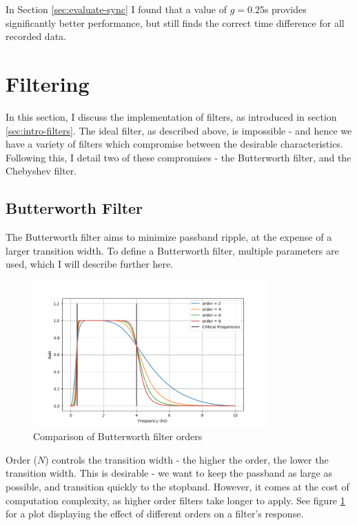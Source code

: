 \documentclass[12pt,a4paper,twoside,openright]{report}
\begin{document}
In Section \ref{sec:evaluate-sync} I found that a value of \(g=0.25\)s
provides significantly better performance, but still finds the correct time
difference for all recorded data.

\section{Filtering}

In this section, I discuss the implementation of filters, as introduced in
section
\ref{sec:intro-filters}. The ideal filter, as described above, is impossible - and 
hence we have a
variety of filters which compromise between the desirable characteristics.
Following this, I detail two of these compromises - the Butterworth filter,
and the Chebyshev filter.


\subsection{Butterworth Filter}

The Butterworth filter aims to minimize passband ripple, at the expense of a
larger transition width. To define a Butterworth filter, multiple parameters
are used, which I will describe further here.

\begin{figure}[h]
	\centerline{\includegraphics[width=0.8\textwidth]{figs/butter-order-comparison.png}}
\caption{Comparison of Butterworth filter orders}
\label{fig:butterworth-order}
\end{figure}

Order (\(N\)) controls the transition width - the higher the order, the lower
the transition width. This is desirable - we want to keep the passband as
large as possible, and transition quickly to the stopband. However, it comes
at the cost of computation complexity, as higher order filters take longer to
apply. See figure \ref{fig:butterworth-order} for a plot displaying the effect
of different orders on a filter's response.
\end{document}

